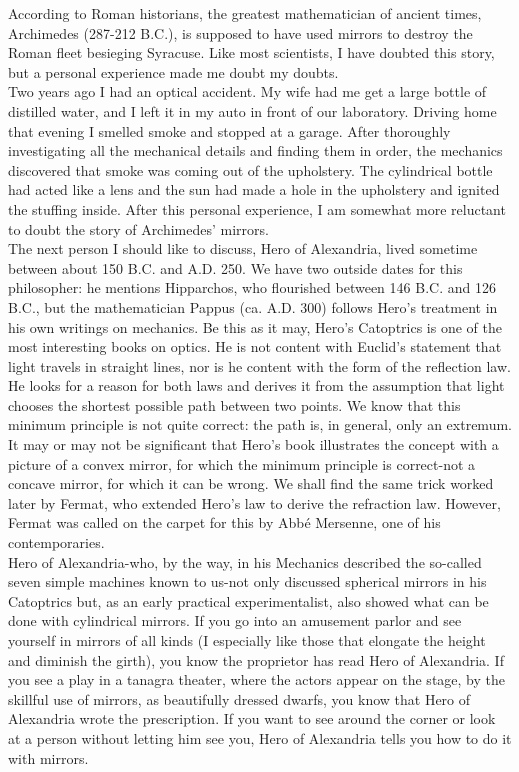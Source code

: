             According to Roman historians, the greatest mathematician of ancient times, Archimedes (287-212 B.C.), is supposed to have used mirrors to destroy the Roman fleet besieging Syracuse. Like most scientists, I have doubted this story, but a personal experience made me doubt my doubts.\\

            Two years ago I had an optical accident. My wife had me get a large bottle of distilled water, and I left it in my auto in front of our laboratory. Driving home that evening I smelled smoke and stopped at a garage. After thoroughly investigating all the mechanical details and finding them in order, the mechanics discovered that smoke was coming out of the upholstery. The cylindrical bottle had acted like a lens and the sun had made a hole in the upholstery and ignited the stuffing inside. After this personal experience, I am somewhat more reluctant to doubt the story of Archimedes' mirrors.\\

            The next person I should like to discuss, Hero of Alexandria, lived sometime between about 150 B.C. and A.D. 250. We have two outside dates for this philosopher: he mentions Hipparchos, who flourished between 146 B.C. and 126 B.C., but the mathematician Pappus (ca. A.D. 300) follows Hero's treatment in his own writings on mechanics. Be this as it may, Hero's Catoptrics is one of the most interesting books on optics. He is not content with Euclid's statement that light travels in straight lines, nor is he content with the form of the reflection law. He looks for a reason for both laws and derives it from the assumption that light chooses the shortest possible path between two points. We know that this minimum principle is not quite correct: the path is, in general, only an extremum. It may or may not be significant that Hero's book illustrates the concept with a picture of a convex mirror, for which the minimum principle is correct-not a concave mirror, for which it can be wrong. We shall find the same trick worked later by Fermat, who extended Hero's law to derive the refraction law. However, Fermat was called on the carpet for this by Abbé Mersenne, one of his contemporaries.\\

            Hero of Alexandria-who, by the way, in his Mechanics described the so-called seven simple machines known to us-not only discussed spherical mirrors in his Catoptrics but, as an early practical experimentalist, also showed what can be done with cylindrical mirrors. If you go into an amusement parlor and see yourself in mirrors of all kinds (I especially like those that elongate the height and diminish the girth), you know the proprietor has read Hero of Alexandria. If you see a play in a tanagra theater, where the actors appear on the stage, by the skillful use of mirrors, as beautifully dressed dwarfs, you know that Hero of Alexandria wrote the prescription. If you want to see around the corner or look at a person without letting him see you, Hero of Alexandria tells you how to do it with mirrors.\\

